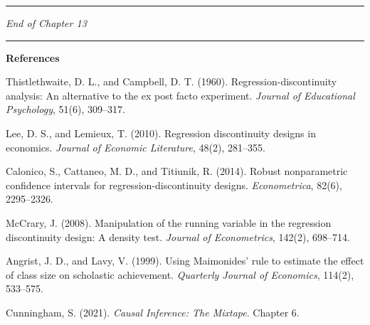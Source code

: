 \medskip\hrule\medskip

\textit{End of Chapter 13}

\medskip\hrule\medskip

\textbf{References}

Thistlethwaite, D. L., and Campbell, D. T. (1960). Regression-discontinuity analysis: An alternative to the ex post facto experiment. \textit{Journal of Educational Psychology}, 51(6), 309--317.

Lee, D. S., and Lemieux, T. (2010). Regression discontinuity designs in economics. \textit{Journal of Economic Literature}, 48(2), 281--355.

Calonico, S., Cattaneo, M. D., and Titiunik, R. (2014). Robust nonparametric confidence intervals for regression-discontinuity designs. \textit{Econometrica}, 82(6), 2295--2326.

McCrary, J. (2008). Manipulation of the running variable in the regression discontinuity design: A density test. \textit{Journal of Econometrics}, 142(2), 698--714.

Angrist, J. D., and Lavy, V. (1999). Using Maimonides' rule to estimate the effect of class size on scholastic achievement. \textit{Quarterly Journal of Economics}, 114(2), 533--575.

Cunningham, S. (2021). \textit{Causal Inference: The Mixtape}. Chapter 6.
